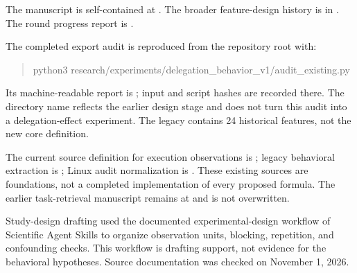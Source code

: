 \documentclass[10pt]{article}
\begin{document}
The manuscript is self-contained at . The broader feature-design history is in . The round progress report is .

The completed export audit is reproduced from the repository root with:
\begin{quote}\small\ttfamily
python3 research/experiments/delegation\_behavior\_v1/audit\_existing.py
\end{quote}
Its machine-readable report is ; input and script hashes are recorded there. The directory name reflects the earlier design stage and does not turn this audit into a delegation-effect experiment. The legacy  contains 24 historical features, not the new core definition.

The current source definition for execution observations is ; legacy behavioral extraction is ; Linux audit normalization is . These existing sources are foundations, not a completed implementation of every proposed formula. The earlier task-retrieval manuscript remains at  and is not overwritten.

Study-design drafting used the documented experimental-design workflow of Scientific Agent Skills \cite{skills} to organize observation units, blocking, repetition, and confounding checks. This workflow is drafting support, not evidence for the behavioral hypotheses. Source documentation was checked on November 1, 2026.
\end{document}
